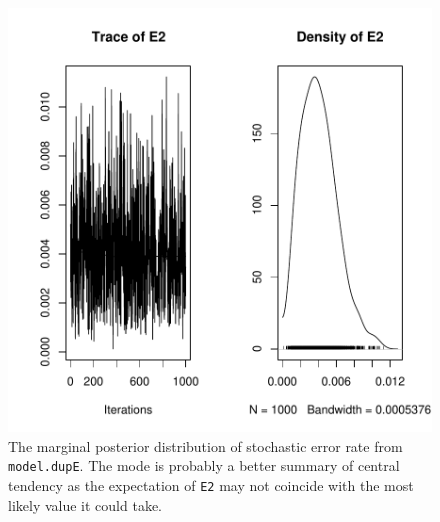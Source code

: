 \documentclass{article}
\begin{document}
\begin{figure}[!h]
\begin{center}
\includegraphics{Tutorial-043}
\end{center}
\caption{The marginal posterior distribution of stochastic error rate from \texttt{model.dupE}. The mode is probably a better summary of central tendency as the expectation of \texttt{E2} may not coincide with the most likely value it could take.}
\label{E2-fig}
\end{figure}
\end{document}
